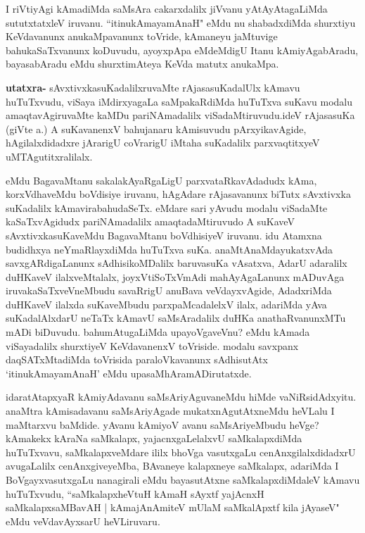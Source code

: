 \begin{artha}
I riVtiyAgi kAmadiMda saMsAra cakarxdalilx jiVvanu yAtAyAtagaLiMda sututxtatxleV iruvanu. ``itinukAmayamAnaH" eMdu nu shabadxdiMda shurxtiyu KeVdavanunx anukaMpavanunx toVride, kAmaneyu jaMtuvige bahukaSaTxvanunx koDuvudu, ayoyxpApa eMdeMdigU Itanu kAmiyAgabAradu, bayasabAradu eMdu shurxtimAteya KeVda matutx anukaMpa.
\end{artha}

\begin{artha}
\textbf{utatxra-} sAvxtivxkasuKadalilxruvaMte rAjasasuKadalUlx kAmavu huTuTxvudu, viSaya iMdirxyagaLa saMpakaRdiMda huTuTxva suKavu modalu amaqtavAgiruvaMte kaMDu pariNAmadalilx viSadaMtiruvudu.ideV rAjasasuKa (giVte a.) A suKavanenxV bahujanaru kAmisuvudu pArxyikavAgide, hAgilalxdidadxre jArarigU coVrarigU iMtaha suKadalilx parxvaqtitxyeV uMTAgutitxralilalx. 
\end{artha}

\begin{artha}
eMdu BagavaMtanu sakalakAyaRgaLigU parxvataRkavAdadudx kAma, korxVdhaveMdu boVdisiye iruvanu, hAgAdare rAjasavanunx biTutx sAvxtivxka suKadalilx kAmavirabahudaSeTx. eMdare sari yAvudu modalu viSadaMte kaSaTxvAgidudx pariNAmadalilx amaqtadaMtiruvudo A suKaveV sAvxtivxkasuKaveMdu BagavaMtanu boVdhisiyeV iruvanu. idu Atamxna budidhxya neYmaRlayxdiMda huTuTxva suKa. anaMtAnaMdayukatxvAda savxgARdigaLanunx sAdhisikoMDalilx baruvasuKa vAsatxva, AdarU adaralilx duHKaveV ilalxveMtalalx, joyxVtiSoTxVmAdi mahAyAgaLanunx mADuvAga iruvakaSaTxveVneMbudu savaRrigU anuBava veVdayxvAgide, AdadxriMda duHKaveV ilalxda suKaveMbudu parxpaMcadalelxV ilalx, adariMda yAva suKadalAlxdarU neTaTx kAmavU saMsAradalilx duHKa anathaRvanunxMTu mADi biDuvudu. bahumAtugaLiMda upayoVgaveVnu? eMdu kAmada viSayadalilx shurxtiyeV KeVdavanenxV toVriside. modalu savxpanx daqSATxMtadiMda toVrisida paraloVkavanunx sAdhisutAtx `itinukAmayamAnaH' eMdu upasaMhAramADirutatxde.
\end{artha}

\begin{artha}
idaratAtapxyaR \ndash  kAmiyAdavanu saMsAriyAguvaneMdu hiMde vaNiRsidAdxyitu. anaMtra kAmisadavanu saMsAriyAgade mukatxnAgutAtxneMdu heVLalu I maMtarxvu baMdide.
yAvanu kAmiyoV avanu saMsAriyeMbudu heVge? kAmakekx kAraNa saMkalapx, yajacnxgaLelalxvU saMkalapxdiMda huTuTxvavu, saMkalapxveMdare ililx bhoVga vasutxgaLu cenAnxgilalxdidadxrU avugaLalilx cenAnxgiveyeMba, BAvaneye kalapxneye saMkalapx, adariMda I BoVgayxvasutxgaLu nanagirali eMdu bayasutAtxne saMkalapxdiMdaleV kAmavu huTuTxvudu, ``saMkalapxheVtuH kAmaH sAyxtf yajAcnxH saMkalapxsaMBavAH | kAmajAnAmiteV mUlaM saMkalApxtf kila jAyaseV" eMdu veVdavAyxsarU heVLiruvaru.
\end{artha}


